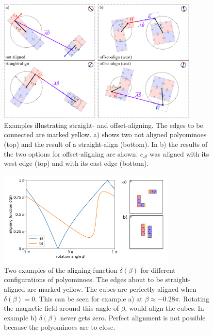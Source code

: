 \begin{figure}
	\centering
	\includegraphics[width=0.90\textwidth]{figures/aligning.pdf}
	\caption[Illustration of straight- and offset-aligning]{Examples illustrating straight- and offset-aligning. The edges to be connected are marked yellow. a) shows two not aligned polyominoes (top) and the result of a straight-align (bottom). In b) the results of the two options for offset-aligning are shown. $c_\mathcal{A}$ was aligned with its west edge (top) and with its east edge (bottom).}
	\label{fig:aligning}
\end{figure}

\begin{figure}
	\centering
	\includegraphics[width=0.8\textwidth]{figures/plots/aligning_function.pdf}
	\caption[Examples of aligning functions $\delta(\beta)$]{Two examples of the aligning function $\delta(\beta)$ for different configurations of polyominoes. The edges about to be straight-aligned are marked yellow. The cubes are perfectly aligned when $\delta(\beta) = 0$. This can be seen for example a) at $\beta \approx -0.28\pi$. Rotating the magnetic field around this angle of $\beta$, would align the cubes. In example b) $\delta(\beta)$ never gets zero. Perfect alignment is not possible because the polyominoes are to close.}
	\label{fig:aligning_plot}
\end{figure}

